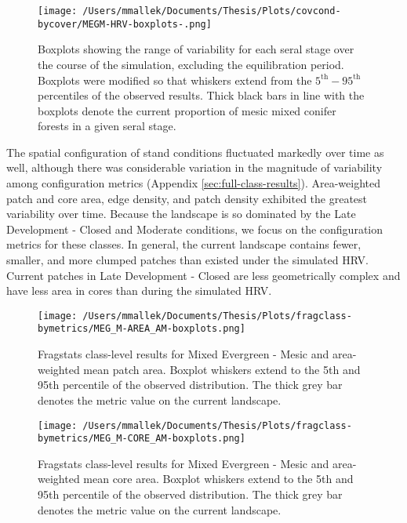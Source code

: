 \begin{figure}[!htbp]
  \centering
    \texttt{[image: /Users/mmallek/Documents/Thesis/Plots/covcond-bycover/MEGM-HRV-boxplots-.png]}
  \caption{Boxplots showing the range of variability for each seral stage over the course of the simulation, excluding the equilibration period. Boxplots were modified so that whiskers extend from the $5^{\text{th}} - 95^{\text{th}}$ percentiles of the observed results. Thick black bars in line with the boxplots denote the current proportion of mesic mixed conifer forests in a given seral stage.} 
  \label{fig:covcond_megm_boxplots}
\end{figure}

The spatial configuration of stand conditions fluctuated markedly over time as well, although there was considerable variation in the magnitude of variability among configuration metrics (Appendix \ref{sec:full-class-results}). Area-weighted patch and core area, edge density, and patch density exhibited the greatest variability over time. Because the landscape is so dominated by the Late Development - Closed and Moderate conditions, we focus on the configuration metrics for these classes. In general, the current landscape contains fewer, smaller, and more clumped patches than existed under the simulated HRV. Current patches in Late Development - Closed are less geometrically complex and have less area in cores than during the simulated HRV.


\begin{figure}[!htbp]
\centering
    \texttt{[image: /Users/mmallek/Documents/Thesis/Plots/fragclass-bymetrics/MEG\_M-AREA\_AM-boxplots.png]}
  \caption{Fragstats class-level results for Mixed Evergreen - Mesic and area-weighted mean patch area. Boxplot whiskers extend to the 5th and 95th percentile of the observed distribution. The thick grey bar denotes the metric value on the current landscape.}
  \label{fig:megm_areaam}
\end{figure}


\begin{figure}[!htbp]
\centering
    \texttt{[image: /Users/mmallek/Documents/Thesis/Plots/fragclass-bymetrics/MEG\_M-CORE\_AM-boxplots.png]}
  \caption{Fragstats class-level results for Mixed Evergreen - Mesic and area-weighted mean core area. Boxplot whiskers extend to the 5th and 95th percentile of the observed distribution. The thick grey bar denotes the metric value on the current landscape.}
  \label{fig:megm_coream}
\end{figure}


